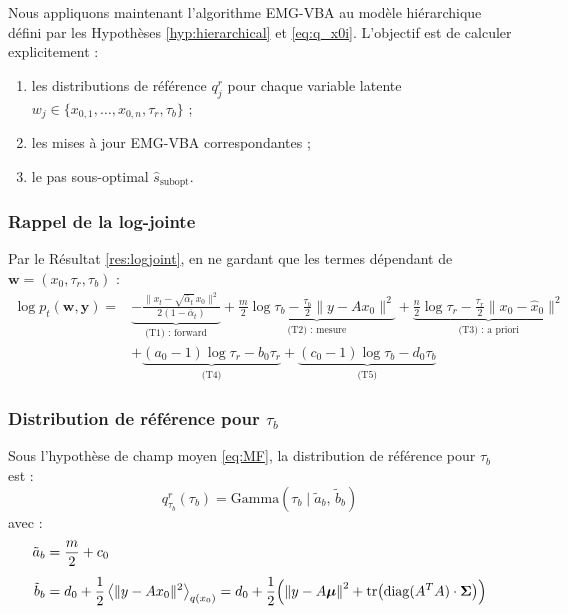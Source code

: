 \documentclass[12pt]{article}
\newcommand{\w}{\boldsymbol{w}}
\newcommand{\y}{\boldsymbol{y}}
\newcommand{\alt}{\bar\alpha_t}
\begin{document}
Nous appliquons maintenant l'algorithme EMG-VBA au modèle hiérarchique défini par les Hypothèses \ref{hyp:hierarchical} et \ref{eq:q_x0i}. L'objectif est de calculer explicitement :
\begin{enumerate}[label=(\roman*)]
    \item les distributions de référence $q_j^r$ pour chaque variable latente $w_j \in \{x_{0,1}, \ldots, x_{0,n}, \tau_r, \tau_b\}$ ;
    \item les mises à jour EMG-VBA correspondantes ;
    \item le pas sous-optimal $\hat{s}_{\mathrm{subopt}}$.
\end{enumerate}

\subsubsection{Rappel de la log-jointe}

Par le Résultat \ref{res:logjoint}, en ne gardant que les termes dépendant de $\w = (x_0, \tau_r, \tau_b)$ :
\begin{equation}
    \begin{aligned}
    \log p_t(\w, \y) = &\underbrace{-\frac{\|x_t - \sqrt{\alt}\, x_0\|^2}{2(1-\alt)}}_{\text{(T1) : forward}} 
    + \underbrace{\frac{m}{2}\log\tau_b - \frac{\tau_b}{2}\|y - Ax_0\|^2}_{\text{(T2) : mesure}} 
    + \underbrace{\frac{n}{2}\log\tau_r - \frac{\tau_r}{2}\|x_0 - \hat{x}_0\|^2}_{\text{(T3) : a priori}} \\
    &+ \underbrace{(a_0-1)\log\tau_r - b_0\tau_r}_{\text{(T4)}} 
    + \underbrace{(c_0-1)\log\tau_b - d_0\tau_b}_{\text{(T5)}}
    \end{aligned}
    \label{eq:logjoint_recall}
\end{equation}

\subsubsection{Distribution de référence pour $\tau_b$}

\begin{propositionbox}
\label{prop:qr_taub}
Sous l'hypothèse de champ moyen \eqref{eq:MF}, la distribution de référence pour $\tau_b$ est :
\begin{equation}
    \boxed{q_{\tau_b}^r(\tau_b) = \mathrm{Gamma}(\tau_b \mid \tilde{a}_b,\, \tilde{b}_b)}
\end{equation}
avec :
\begin{align}
    \tilde{a}_b &= \frac{m}{2} + c_0 \label{eq:atilde_b}\\[4pt]
    \tilde{b}_b &= d_0 + \frac{1}{2}\left\langle \|y - Ax_0\|^2 \right\rangle_{q(x_0)} \label{eq:btilde_b} = d_0 + \frac12 \Bigl( \left\|y - A \boldsymbol{\mu} \right\|^2 +  \mathrm{tr}\!\left(\mathrm{diag}(A^T A) \cdot \boldsymbol{\Sigma}\right) \Bigr)
\end{align}
\end{propositionbox}
\end{document}
